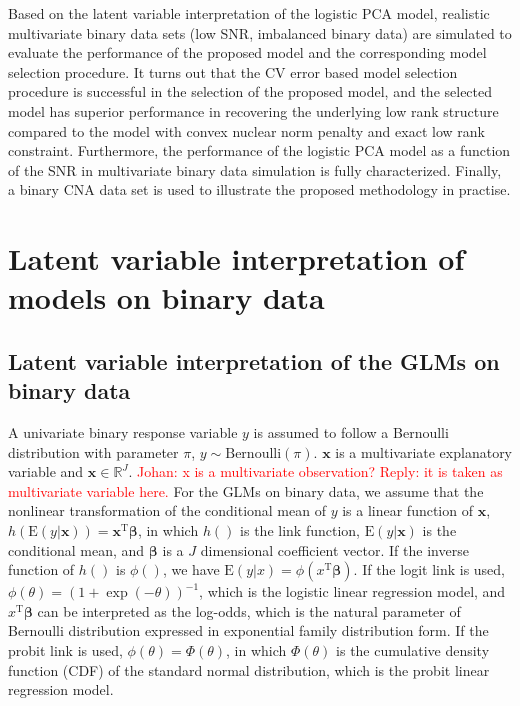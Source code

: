 Based on the latent variable interpretation of the logistic PCA model, realistic multivariate binary data sets (low SNR, imbalanced binary data) are simulated to evaluate the performance of the proposed model and the corresponding model selection procedure. It turns out that the CV error based model selection procedure is successful in the selection of the proposed model, and the selected model has superior performance in recovering the underlying low rank structure compared to the model with convex nuclear norm penalty and exact low rank constraint. Furthermore, the performance of the logistic PCA model as a function of the SNR in multivariate binary data simulation is fully characterized. Finally, a binary CNA data set is used to illustrate the proposed methodology in practise.

\section{Latent variable interpretation of models on binary data}
\subsection{Latent variable interpretation of the GLMs on binary data}
A univariate binary response variable $y$ is assumed to follow a Bernoulli distribution with parameter $\pi$, $y \sim \text{Bernoulli}(\pi)$. $\mathbf{x}$ is a multivariate explanatory variable and $\mathbf{x} \in \mathbb{R}^J$. \textcolor{red}{Johan: x is a multivariate observation? Reply: it is taken as multivariate variable here.} For the GLMs on binary data, we assume that the nonlinear transformation of the conditional mean of $y$ is a linear function of $\mathbf{x}$, $h(\text{E}(y|\mathbf{x})) = \mathbf{x}^{\text{T}} \bm{\beta}$, in which $h()$ is the link function, $\text{E}(y|\mathbf{x})$ is the conditional mean, and $\bm{\beta}$ is a $J$ dimensional coefficient vector. If the inverse function of $h()$ is $\phi()$, we have $\text{E}(y|x) = \phi(x^{\text{T}}\bm{\beta})$. If the logit link is used, $\phi(\theta) = (1+\exp(-\theta))^{-1}$, which is the logistic linear regression model, and $x^{\text{T}}\bm{\beta}$ can be interpreted as the log-odds, which is the natural parameter of Bernoulli distribution expressed in exponential family distribution form. If the probit link is used, $\phi(\theta) = \Phi(\theta)$, in which $\Phi(\theta)$ is the cumulative density function (CDF) of the standard normal distribution, which is the probit linear regression model.

